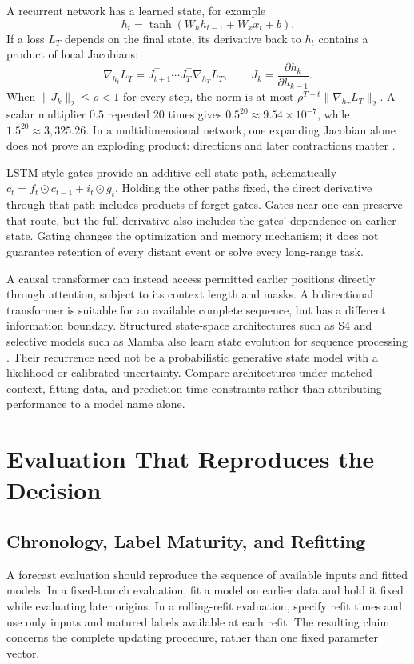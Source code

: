A recurrent network has a learned state, for example
\[
 h_t=\tanh(W_hh_{t-1}+W_xx_t+b).
\]
If a loss $L_T$ depends on the final state, its derivative back to $h_t$ contains a product of local Jacobians:
\[
 \nabla_{h_t}L_T=J_{t+1}^\top\cdots J_T^\top\nabla_{h_T}L_T,
 \qquad J_k=\frac{\partial h_k}{\partial h_{k-1}}.
\]
When $\|J_k\|_2\le\rho<1$ for every step, the norm is at most $\rho^{T-t}\|\nabla_{h_T}L_T\|_2$. A scalar multiplier $0.5$ repeated 20 times gives $0.5^{20}\approx9.54\times10^{-7}$, while $1.5^{20}\approx3{,}325.26$. In a multidimensional network, one expanding Jacobian alone does not prove an exploding product: directions and later contractions matter \citep{pascanu2013rnn}.

LSTM-style gates provide an additive cell-state path, schematically $c_t=f_t\odot c_{t-1}+i_t\odot g_t$. Holding the other paths fixed, the direct derivative through that path includes products of forget gates. Gates near one can preserve that route, but the full derivative also includes the gates' dependence on earlier state. Gating changes the optimization and memory mechanism; it does not guarantee retention of every distant event or solve every long-range task.

A causal transformer can instead access permitted earlier positions directly through attention, subject to its context length and masks. A bidirectional transformer is suitable for an available complete sequence, but has a different information boundary. Structured state-space architectures such as S4 and selective models such as Mamba also learn state evolution for sequence processing \citep{gu2022s4,gu2023mamba}. Their recurrence need not be a probabilistic generative state model with a likelihood or calibrated uncertainty. Compare architectures under matched context, fitting data, and prediction-time constraints rather than attributing performance to a model name alone.

\section{Evaluation That Reproduces the Decision}

\subsection{Chronology, Label Maturity, and Refitting}

A forecast evaluation should reproduce the sequence of available inputs and fitted models. In a fixed-launch evaluation, fit a model on earlier data and hold it fixed while evaluating later origins. In a rolling-refit evaluation, specify refit times and use only inputs and matured labels available at each refit. The resulting claim concerns the complete updating procedure, rather than one fixed parameter vector.


